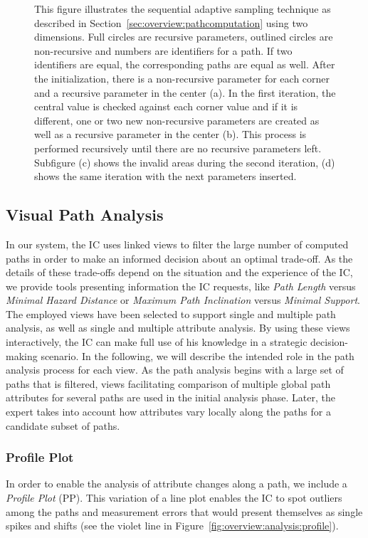 \documentclass{egpubl}
\begin{document}
\begin{figure}
{		\label{fig:sampling:adaptive:4}
	}
	\hfill
	\caption{This figure illustrates the sequential adaptive sampling technique as described in Section~\ref{sec:overview:pathcomputation} using two dimensions. Full circles are recursive parameters, outlined circles are non-recursive and numbers are identifiers for a path. If two identifiers are equal, the corresponding paths are equal as well. After the initialization, there is a non-recursive parameter for each corner and a recursive parameter in the center (a). In the first iteration, the central value is checked against each corner value and if it is different, one or two new non-recursive parameters are created as well as a recursive parameter in the center (b). This process is performed recursively until there are no recursive parameters left. Subfigure (c) shows the invalid areas during the second iteration, (d) shows the same iteration with the next parameters inserted.}
	\label{fig:sampling:adaptive}
\end{figure}

\subsection{Visual Path Analysis} \label{sec:overview:pathanalysis}
In our system, the IC uses linked views to filter the large number of computed paths in order to make an informed decision about an optimal trade-off. As the details of these trade-offs depend on the situation and the experience of the IC, we provide tools presenting information the IC requests, like \emph{Path Length} versus \emph{Minimal Hazard Distance} or \emph{Maximum Path Inclination} versus \emph{Minimal Support}. The employed views have been selected to support single and multiple path analysis, as well as single and multiple attribute analysis. By using these views interactively, the IC can make full use of his knowledge in a strategic decision-making scenario. In the following, we will describe the intended role in the path analysis process for each view. As the path analysis begins with a large set of paths that is filtered, views facilitating comparison of multiple global path attributes for several paths are used in the initial analysis phase. Later, the expert takes into account how attributes vary locally along the paths for a candidate subset of paths.

\subsubsection{Profile Plot} \label{sec:overview:analysis:profile}
In order to enable the analysis of attribute changes along a path, we include a \emph{Profile Plot} (PP). This variation of a line plot enables the IC to spot outliers among the paths and measurement errors that would present themselves as single spikes and shifts (see the violet line in Figure~\ref{fig:overview:analysis:profile}).
\end{document}
